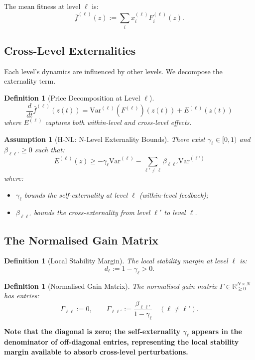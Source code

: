 \documentclass[12pt]{article}
\newtheorem{definition}[theorem]{Definition}
\newtheorem{assumption}[theorem]{Assumption}
\newcommand{\R}{\mathbb{R}}
\newcommand{\Var}{\mathrm{Var}}
\newcommand{\added}[1]{\textbf{#1}}
\begin{document}
The mean fitness at level $\ell$ is:
\[
\bar{f}^{(\ell)}(z) := \sum_i x^{(\ell)}_i F^{(\ell)}_i(z).
\]

\subsection{Cross-Level Externalities}

Each level's dynamics are influenced by other levels. We decompose the externality term.

\begin{definition}[Price Decomposition at Level $\ell$]
\[
\frac{d}{dt} \bar{f}^{(\ell)}(z(t)) = \Var^{(\ell)}(F^{(\ell)})(z(t)) + E^{(\ell)}(z(t))
\]
where $E^{(\ell)}$ captures both within-level and cross-level effects.
\end{definition}

\begin{assumption}[H-NL: N-Level Externality Bounds]
\label{ass:h-nl}
There exist $\gamma_\ell \in [0, 1)$ and $\beta_{\ell\ell'} \geq 0$ such that:
\[
E^{(\ell)}(z) \geq -\gamma_\ell \Var^{(\ell)} - \sum_{\ell' \neq \ell} \beta_{\ell\ell'} \Var^{(\ell')}
\]
where:
\begin{itemize}
    \item $\gamma_\ell$ bounds the self-externality at level $\ell$ (within-level feedback);
    \item $\beta_{\ell\ell'}$ bounds the cross-externality from level $\ell'$ to level $\ell$.
\end{itemize}
\end{assumption}

\subsection{The Normalised Gain Matrix}

\begin{definition}[Local Stability Margin]
The \emph{local stability margin} at level $\ell$ is:
\[
d_\ell := 1 - \gamma_\ell > 0.
\]
\end{definition}

\begin{definition}[Normalised Gain Matrix]
\label{def:gain-matrix}
The \emph{normalised gain matrix} $\Gamma \in \R^{N \times N}_{\geq 0}$ has entries:
\[
\Gamma_{\ell\ell} := 0, \qquad \Gamma_{\ell\ell'} := \frac{\beta_{\ell\ell'}}{1 - \gamma_\ell} \quad (\ell \neq \ell').
\]
\end{definition}

\added{\textbf{Note that the diagonal is zero; the self-externality $\gamma_\ell$ appears in the denominator of off-diagonal entries, representing the local stability margin available to absorb cross-level perturbations.}}
\end{document}
